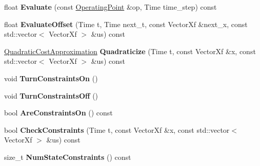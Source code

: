 \begin{DoxyCompactItemize}
\item 
float {\bfseries Evaluate} (const \hyperlink{structilqgames_1_1_operating_point}{Operating\+Point} \&op, Time time\+\_\+step) const \hypertarget{classilqgames_1_1_player_cost_a8c7fc17986dfb478df17cf9f8da85926}{}\label{classilqgames_1_1_player_cost_a8c7fc17986dfb478df17cf9f8da85926}

\item 
float {\bfseries Evaluate\+Offset} (Time t, Time next\+\_\+t, const Vector\+Xf \&next\+\_\+x, const std\+::vector$<$ Vector\+Xf $>$ \&us) const \hypertarget{classilqgames_1_1_player_cost_a56bf9c10b7ffa6fbdfb1a9bff1ce65c3}{}\label{classilqgames_1_1_player_cost_a56bf9c10b7ffa6fbdfb1a9bff1ce65c3}

\item 
\hyperlink{structilqgames_1_1_quadratic_cost_approximation}{Quadratic\+Cost\+Approximation} {\bfseries Quadraticize} (Time t, const Vector\+Xf \&x, const std\+::vector$<$ Vector\+Xf $>$ \&us) const \hypertarget{classilqgames_1_1_player_cost_ad3962847f8eda8bcfecf2096e6abccb6}{}\label{classilqgames_1_1_player_cost_ad3962847f8eda8bcfecf2096e6abccb6}

\item 
void {\bfseries Turn\+Constraints\+On} ()\hypertarget{classilqgames_1_1_player_cost_a6afcddbb08549f6e9e1167fdbe335306}{}\label{classilqgames_1_1_player_cost_a6afcddbb08549f6e9e1167fdbe335306}

\item 
void {\bfseries Turn\+Constraints\+Off} ()\hypertarget{classilqgames_1_1_player_cost_a24a3d61475539dfab3263b9cb30c4fa6}{}\label{classilqgames_1_1_player_cost_a24a3d61475539dfab3263b9cb30c4fa6}

\item 
bool {\bfseries Are\+Constraints\+On} () const \hypertarget{classilqgames_1_1_player_cost_acc8c6a6a143b8fd090d3087ac14eeb96}{}\label{classilqgames_1_1_player_cost_acc8c6a6a143b8fd090d3087ac14eeb96}

\item 
bool {\bfseries Check\+Constraints} (Time t, const Vector\+Xf \&x, const std\+::vector$<$ Vector\+Xf $>$ \&us) const \hypertarget{classilqgames_1_1_player_cost_a7c3268b3d9f2d1768096ac0c3adb7cb9}{}\label{classilqgames_1_1_player_cost_a7c3268b3d9f2d1768096ac0c3adb7cb9}

\item 
size\+\_\+t {\bfseries Num\+State\+Constraints} () const \hypertarget{classilqgames_1_1_player_cost_a3b3e0bac90840bac45c57b74c9efcf19}{}\label{classilqgames_1_1_player_cost_a3b3e0bac90840bac45c57b74c9efcf19}


\end{DoxyCompactItemize}
